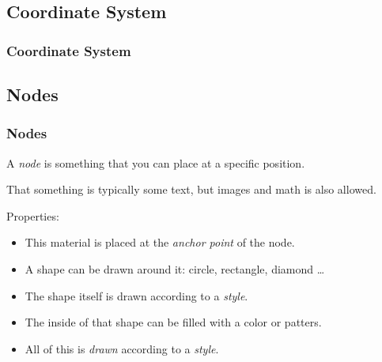 {\begin{frame}[fragile]
\end{frame}

\subsection{Coordinate System}
\begin{frame}[fragile]
  \frametitle{Coordinate System}
  \vspace{3mm}
  \begin{center}
  \end{center}
\end{frame}

\subsection{Nodes}
\begin{frame}[fragile]
  \frametitle{Nodes}
  \vspace{3mm}
  A \textsl{node} is something that you can place at a specific position.
  
  \vspace{5mm}
  That something is typically some text, but images and math is also allowed.
  
  \pause
  \vspace{5mm}
  Properties:
  \begin{itemize}
    \item This material is placed at the \textsl{anchor point} of the node.
    \item A shape can be drawn around it: circle, rectangle, diamond \ldots
    \item The shape itself is drawn according to a \textsl{style}.
    \item The inside of that shape can be filled with a color or patters.
    \item All of this is \textsl{drawn} according to a \textsl{style}.
  \end{itemize}
\end{frame}

}
